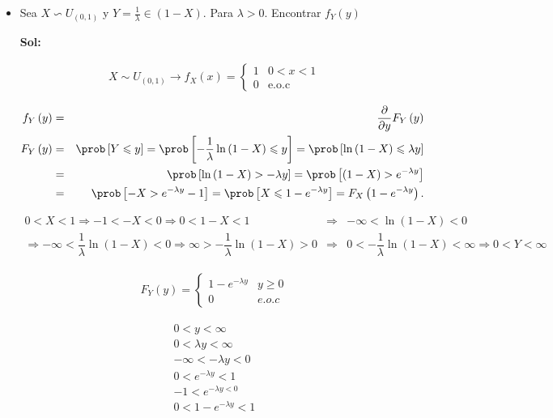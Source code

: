 \bigskip

\begin{Ejem}
\begin{itemize}
\item Sea $X \backsim U_{\left(0,1\right)}$ y $Y=\frac{1}{\lambda}\in \left( 1-X \right)$. 
Para $\lambda > 0$. Encontrar $f_{Y}\left(y\right)$

\textbf{Sol:}

\begin{eqnarray*}
X \sim U_{\left(0,1\right)}\longrightarrow f_{X}\left(x\right)= \left\{
\begin{array}{cc}
1 & 0< x <1 \\
0 & \textrm {e.o.c} 
\end{array}
\right.
\end{eqnarray*} 

\begin{eqnarray*}
f_{Y}\left( y \right) &=& \dfrac{\partial}{\partial y} F_{Y}\left(y \right)\\
F_{Y}\left( y \right) &=& \prob \left[ Y \leqslant y \right]  = \prob \left[-\dfrac{1}{\lambda}\ln \left( 1-X\right) \leqslant y \right] =\prob \left[ \ln \left( 1-X \right) \leqslant \lambda y \right]\\
&=&\prob \left[ \ln \left( 1-X \right) > - \lambda y \right] = \prob \left[ \left( 1-X \right) > e^ {- \lambda y}\right] \\
&=& \prob \left[-X > e^ {-\lambda y} - 1 \right] = \prob \left[X \leqslant 1- e^{- \lambda y}\right] = F_{X}\left(1-e^{-\lambda y}\right).
\end{eqnarray*}  

\begin{eqnarray*}
0<X<1 \Rightarrow -1< -X < 0 \Rightarrow 0 < 1-X < 1&\Rightarrow&
-\infty < \ln \left(1-X\right) < 0\\
\Rightarrow  -\infty < \dfrac{1}{\lambda} \ln \left(1-X\right) < 0 \Rightarrow  \infty > - \dfrac{1}{\lambda}  \ln \left(1-X\right) > 0&\Rightarrow&
0 < - \dfrac{1}{\lambda}  \ln \left(1-X\right) <\infty \Rightarrow 0< Y < \infty
\end{eqnarray*}

\begin{eqnarray*}
F_{Y}\left(y\right) = \left\{ 
\begin{array}{cc} 1-e^{-\lambda y} &  y \geq 0 \\
0 &  e.o.c 
\end{array}
\right.
\end{eqnarray*}

\begin{eqnarray*}
0 < y < \infty \\
0 < \lambda y < \infty \\
- \infty < -\lambda y < 0 \\
0 < e ^{-\lambda y} < 1 \\
-1 < e^{-\lambda y < 0}\\
0 < 1 - e^{-\lambda y} < 1\\
\end{eqnarray*}


\end{itemize}
\end{Ejem}
